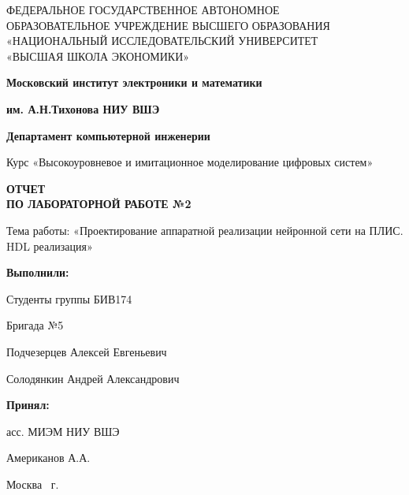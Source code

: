 \begin{titlepage}
    \begin{center}
        ФЕДЕРАЛЬНОЕ ГОСУДАРСТВЕННОЕ АВТОНОМНОЕ \\
        ОБРАЗОВАТЕЛЬНОЕ УЧРЕЖДЕНИЕ ВЫСШЕГО ОБРАЗОВАНИЯ\\
        «НАЦИОНАЛЬНЫЙ ИССЛЕДОВАТЕЛЬСКИЙ УНИВЕРСИТЕТ\\
        «ВЫСШАЯ ШКОЛА ЭКОНОМИКИ»
    \end{center}

    \begin{center}
        \textbf{Московский институт электроники и математики}

        \textbf{им. А.Н.Тихонова НИУ ВШЭ}

        \vspace{2ex}

        \textbf{Департамент компьютерной инженерии}
    \end{center}
    \vspace{1ex}

    \begin{center}
        Курс «Высокоуровневое и имитационное моделирование цифровых систем»
    \end{center}


    \begin{center}
        \textbf{ОТЧЕТ\\
        ПО ЛАБОРАТОРНОЙ РАБОТЕ №2
        }
    \end{center}

    \begin{center}
        Тема работы: «Проектирование аппаратной реализации нейронной сети на ПЛИС.
        HDL реализация»
    \end{center}

    \vspace{2ex}

    \begin{flushright}
        \textbf{Выполнили:}

        \vspace{2ex}

        Студенты группы БИВ174

        Бригада №5

        \vspace{2ex}

        Подчезерцев Алексей Евгеньевич

        Солодянкин Андрей Александрович
        \vspace{2ex}

        \textbf{Принял:}

        асс. МИЭМ НИУ ВШЭ

        Американов А.А.

    \end{flushright}

    \vfill
    \begin{center}
        Москва \the\year \, г.
    \end{center}

\end{titlepage}
\addtocounter{page}{1}
